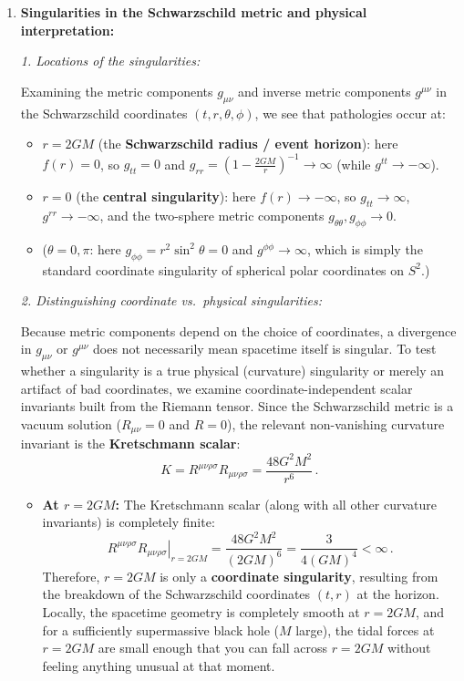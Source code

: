 \documentclass[12pt]{article}
\newcommand{\be}{\begin{equation}}
\newcommand{\ee}{\end{equation}}
\begin{document}
\begin{enumerate}[label=\alph*)]
\item \textbf{Singularities in the Schwarzschild metric and physical interpretation:}

\emph{1. Locations of the singularities:}

Examining the metric components $g_{\mu\nu}$ and inverse metric components $g^{\mu\nu}$ in the Schwarzschild coordinates $(t,r,\theta,\phi)$, we see that pathologies occur at:
\begin{itemize}
\item $r = 2GM$ (the \textbf{Schwarzschild radius / event horizon}): here $f(r) = 0$, so $g_{tt} = 0$ and $g_{rr} = \left(1 - \frac{2GM}{r}\right)^{-1} \to \infty$ (while $g^{tt} \to -\infty$).
\item $r = 0$ (the \textbf{central singularity}): here $f(r) \to -\infty$, so $g_{tt} \to \infty$, $g^{rr} \to -\infty$, and the two-sphere metric components $g_{\theta\theta}, g_{\phi\phi} \to 0$.
\item ($\theta = 0, \pi$: here $g_{\phi\phi} = r^2\sin^2\theta = 0$ and $g^{\phi\phi} \to \infty$, which is simply the standard coordinate singularity of spherical polar coordinates on $S^2$.)
\end{itemize}

\emph{2. Distinguishing coordinate vs.\ physical singularities:}

Because metric components depend on the choice of coordinates, a divergence in $g_{\mu\nu}$ or $g^{\mu\nu}$ does not necessarily mean spacetime itself is singular. To test whether a singularity is a true physical (curvature) singularity or merely an artifact of bad coordinates, we examine coordinate-independent scalar invariants built from the Riemann tensor. Since the Schwarzschild metric is a vacuum solution ($R_{\mu\nu} = 0$ and $R = 0$), the relevant non-vanishing curvature invariant is the \textbf{Kretschmann scalar}:
\be
K = R^{\mu\nu\rho\sigma} R_{\mu\nu\rho\sigma} = \frac{48 G^2 M^2}{r^6} \,.
\ee
\begin{itemize}
\item \textbf{At $r = 2GM$:} The Kretschmann scalar (along with all other curvature invariants) is completely finite:
\be
\left. R^{\mu\nu\rho\sigma} R_{\mu\nu\rho\sigma} \right|_{r = 2GM} = \frac{48 G^2 M^2}{(2GM)^6} = \frac{3}{4 (GM)^4} < \infty \,.
\ee
Therefore, $r = 2GM$ is only a \textbf{coordinate singularity}, resulting from the breakdown of the Schwarzschild coordinates $(t,r)$ at the horizon. Locally, the spacetime geometry is completely smooth at $r = 2GM$, and for a sufficiently supermassive black hole ($M$ large), the tidal forces at $r = 2GM$ are small enough that you can fall across $r = 2GM$ without feeling anything unusual at that moment.


\end{itemize}
\end{enumerate}
\end{document}
